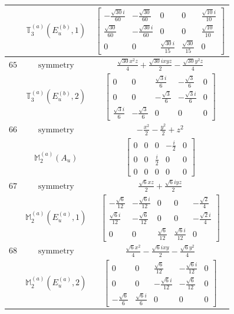 \documentclass[fleqn,8pt,landscape]{jsarticle}
\begin{document}
\begin{longtable}{ccc}
$  $ & $ \mathbb{T}_{3}^{(a)}(E_{u}^{(b)},1) $ & $ \begin{bmatrix} - \frac{\sqrt{30} i}{60} & - \frac{\sqrt{30}}{60} & 0 & 0 & \frac{\sqrt{10} i}{10} \\ \frac{\sqrt{30}}{60} & - \frac{\sqrt{30} i}{60} & 0 & 0 & \frac{\sqrt{10}}{10} \\ 0 & 0 & \frac{\sqrt{30} i}{15} & \frac{\sqrt{30}}{15} & 0 \end{bmatrix} $ \\ \hline
$ 65 $ & $ \text{symmetry} $ & $ \frac{\sqrt{30} x^{2} z}{4} + \frac{\sqrt{30} i x y z}{2} - \frac{\sqrt{30} y^{2} z}{4} $ \\
$  $ & $ \mathbb{T}_{3}^{(a)}(E_{u}^{(b)},2) $ & $ \begin{bmatrix} 0 & 0 & \frac{\sqrt{3} i}{6} & - \frac{\sqrt{3}}{6} & 0 \\ 0 & 0 & - \frac{\sqrt{3}}{6} & - \frac{\sqrt{3} i}{6} & 0 \\ \frac{\sqrt{3} i}{6} & - \frac{\sqrt{3}}{6} & 0 & 0 & 0 \end{bmatrix} $ \\ \hline
$ 66 $ & $ \text{symmetry} $ & $ - \frac{x^{2}}{2} - \frac{y^{2}}{2} + z^{2} $ \\
$  $ & $ \mathbb{M}_{2}^{(a)}(A_{u}) $ & $ \begin{bmatrix} 0 & 0 & 0 & - \frac{i}{2} & 0 \\ 0 & 0 & \frac{i}{2} & 0 & 0 \\ 0 & 0 & 0 & 0 & 0 \end{bmatrix} $ \\ \hline
$ 67 $ & $ \text{symmetry} $ & $ \frac{\sqrt{6} x z}{2} + \frac{\sqrt{6} i y z}{2} $ \\
$  $ & $ \mathbb{M}_{2}^{(a)}(E_{u}^{(a)},1) $ & $ \begin{bmatrix} - \frac{\sqrt{6}}{12} & - \frac{\sqrt{6} i}{12} & 0 & 0 & - \frac{\sqrt{2}}{4} \\ \frac{\sqrt{6} i}{12} & - \frac{\sqrt{6}}{12} & 0 & 0 & - \frac{\sqrt{2} i}{4} \\ 0 & 0 & \frac{\sqrt{6}}{12} & \frac{\sqrt{6} i}{12} & 0 \end{bmatrix} $ \\ \hline
$ 68 $ & $ \text{symmetry} $ & $ \frac{\sqrt{6} x^{2}}{4} - \frac{\sqrt{6} i x y}{2} - \frac{\sqrt{6} y^{2}}{4} $ \\
$  $ & $ \mathbb{M}_{2}^{(a)}(E_{u}^{(a)},2) $ & $ \begin{bmatrix} 0 & 0 & \frac{\sqrt{6}}{12} & - \frac{\sqrt{6} i}{12} & 0 \\ 0 & 0 & - \frac{\sqrt{6} i}{12} & - \frac{\sqrt{6}}{12} & 0 \\ - \frac{\sqrt{6}}{6} & \frac{\sqrt{6} i}{6} & 0 & 0 & 0 \end{bmatrix} $ \\ \hline

\end{longtable}
\end{document}
